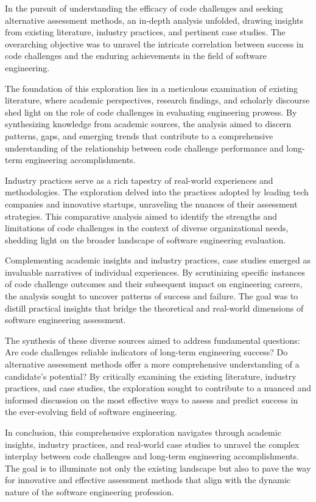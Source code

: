 \documentclass[
    a4paper, %
    10pt, %
    unnumberedsections, %
    twoside, %
]{LTJournalArticle}
\begin{document}
In the pursuit of understanding the efficacy of code challenges and seeking alternative assessment methods, an in-depth analysis unfolded, drawing insights from existing literature, industry practices, and pertinent case studies. The overarching objective was to unravel the intricate correlation between success in code challenges and the enduring achievements in the field of software engineering.

The foundation of this exploration lies in a meticulous examination of existing literature, where academic perspectives, research findings, and scholarly discourse shed light on the role of code challenges in evaluating engineering prowess. By synthesizing knowledge from academic sources, the analysis aimed to discern patterns, gaps, and emerging trends that contribute to a comprehensive understanding of the relationship between code challenge performance and long-term engineering accomplishments.

Industry practices serve as a rich tapestry of real-world experiences and methodologies. The exploration delved into the practices adopted by leading tech companies and innovative startups, unraveling the nuances of their assessment strategies. This comparative analysis aimed to identify the strengths and limitations of code challenges in the context of diverse organizational needs, shedding light on the broader landscape of software engineering evaluation.

Complementing academic insights and industry practices, case studies emerged as invaluable narratives of individual experiences. By scrutinizing specific instances of code challenge outcomes and their subsequent impact on engineering careers, the analysis sought to uncover patterns of success and failure. The goal was to distill practical insights that bridge the theoretical and real-world dimensions of software engineering assessment.

The synthesis of these diverse sources aimed to address fundamental questions: Are code challenges reliable indicators of long-term engineering success? Do alternative assessment methods offer a more comprehensive understanding of a candidate's potential? By critically examining the existing literature, industry practices, and case studies, the exploration sought to contribute to a nuanced and informed discussion on the most effective ways to assess and predict success in the ever-evolving field of software engineering.

In conclusion, this comprehensive exploration navigates through academic insights, industry practices, and real-world case studies to unravel the complex interplay between code challenges and long-term engineering accomplishments. The goal is to illuminate not only the existing landscape but also to pave the way for innovative and effective assessment methods that align with the dynamic nature of the software engineering profession.
\end{document}
